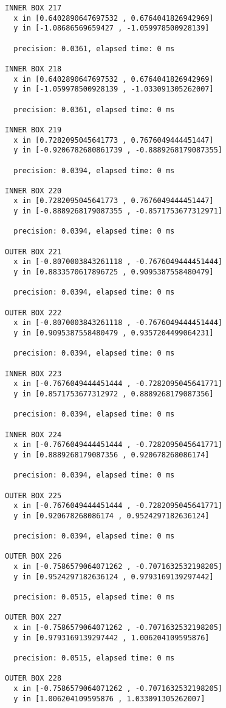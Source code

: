 \begin{verbatim}
INNER BOX 217
  x in [0.6402890647697532 , 0.6764041826942969]
  y in [-1.08686569659427 , -1.059978500928139]

  precision: 0.0361, elapsed time: 0 ms

INNER BOX 218
  x in [0.6402890647697532 , 0.6764041826942969]
  y in [-1.059978500928139 , -1.033091305262007]

  precision: 0.0361, elapsed time: 0 ms

INNER BOX 219
  x in [0.7282095045641773 , 0.7676049444451447]
  y in [-0.9206782680861739 , -0.8889268179087355]

  precision: 0.0394, elapsed time: 0 ms

INNER BOX 220
  x in [0.7282095045641773 , 0.7676049444451447]
  y in [-0.8889268179087355 , -0.8571753677312971]

  precision: 0.0394, elapsed time: 0 ms

OUTER BOX 221
  x in [-0.8070003843261118 , -0.7676049444451444]
  y in [0.8833570617896725 , 0.9095387558480479]

  precision: 0.0394, elapsed time: 0 ms

OUTER BOX 222
  x in [-0.8070003843261118 , -0.7676049444451444]
  y in [0.9095387558480479 , 0.9357204499064231]

  precision: 0.0394, elapsed time: 0 ms

INNER BOX 223
  x in [-0.7676049444451444 , -0.7282095045641771]
  y in [0.8571753677312972 , 0.8889268179087356]

  precision: 0.0394, elapsed time: 0 ms

INNER BOX 224
  x in [-0.7676049444451444 , -0.7282095045641771]
  y in [0.8889268179087356 , 0.920678268086174]

  precision: 0.0394, elapsed time: 0 ms

OUTER BOX 225
  x in [-0.7676049444451444 , -0.7282095045641771]
  y in [0.920678268086174 , 0.9524297182636124]

  precision: 0.0394, elapsed time: 0 ms

OUTER BOX 226
  x in [-0.7586579064071262 , -0.7071632532198205]
  y in [0.9524297182636124 , 0.9793169139297442]

  precision: 0.0515, elapsed time: 0 ms

OUTER BOX 227
  x in [-0.7586579064071262 , -0.7071632532198205]
  y in [0.9793169139297442 , 1.006204109595876]

  precision: 0.0515, elapsed time: 0 ms

OUTER BOX 228
  x in [-0.7586579064071262 , -0.7071632532198205]
  y in [1.006204109595876 , 1.033091305262007]


\end{verbatim}
